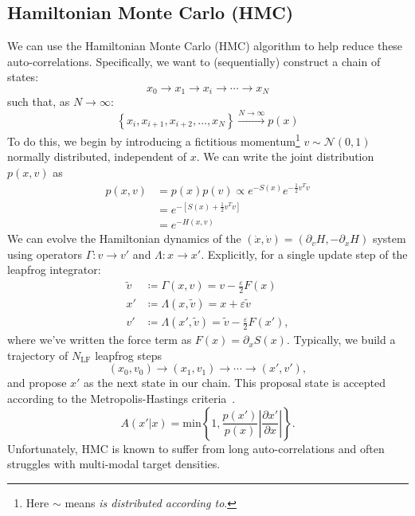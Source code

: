 \documentclass[a4paper,11pt]{article}
\begin{document}
\subsection{\label{subsec:hmc}Hamiltonian Monte Carlo (HMC)}
%
We can use the Hamiltonian Monte Carlo (HMC) algorithm to help reduce these auto-correlations.
%
Specifically, we want to (sequentially) construct a chain of states:
%
\begin{equation}
x_{0} \rightarrow x_{1} \rightarrow x_{i} \rightarrow \cdots \rightarrow x_{N}
\end{equation}
%
such that, as $N \rightarrow \infty$:
%
\begin{equation}
\left\{x_{i}, x_{i+1}, x_{i+2}, \ldots, x_{N}\right\} \xrightarrow[]{N\rightarrow\infty} p(x)
\end{equation}
%
To do this, we begin by introducing a fictitious momentum\footnote{Here $\sim$ means \textit{is distributed according to}.} $v \sim \mathcal{N}(0, 1)$ normally distributed, independent of $x$.
%
We can write the joint distribution $p(x, v)$ as
%
\begin{align}
p(x, v) &= p(x) p(v) \propto e^{-S(x)} e^{-\frac{1}{2} v^{T}v} \\
&= e^{-\left[S(x) + \frac{1}{2} v^{T} v \right]} \\
&= e^{-H(x, v)}
\end{align}
%
We can evolve the Hamiltonian dynamics of the $(\dot{x}, \dot{v}) = (\partial_{v} H, -\partial_{x} H)$ system using operators $\Gamma: v \rightarrow v'$ and $\Lambda: x \rightarrow x'$.
%
Explicitly, for a single update step of the leapfrog integrator:
%
\begin{align}
\tilde{v} &\coloneqq \Gamma(x, v) = v - \frac{\varepsilon}{2} F(x) \\
x' &\coloneqq \Lambda(x, \tilde{v}) = x + \varepsilon \tilde{v} \\
v' &\coloneqq \Lambda(x', \tilde{v}) = \tilde{v} - \frac{\varepsilon}{2} F(x'),
\end{align}
%
where we've written the force term as $F(x) = \partial_{x}S(x)$.
%
Typically, we build a trajectory of $N_{\mathrm{LF}}$ leapfrog steps
%
\begin{equation}
(x_{0}, v_{0}) \rightarrow (x_{1}, v_{1}) \rightarrow \cdots \rightarrow (x', v'),
\end{equation}
%
and propose $x'$ as the next state in our chain.
%
This proposal state is accepted according to the Metropolis-Hastings criteria~\cite{mh}.
%
\begin{equation}
A(x'|x) = \mathrm{min}\left\{{1, \frac{p(x')}{p(x)} \left| \frac{\partial x'}{\partial x} \right|}\right\}.
\end{equation}
%
Unfortunately, HMC is known to suffer from long auto-correlations and often struggles with multi-modal target densities.
%
\end{document}
